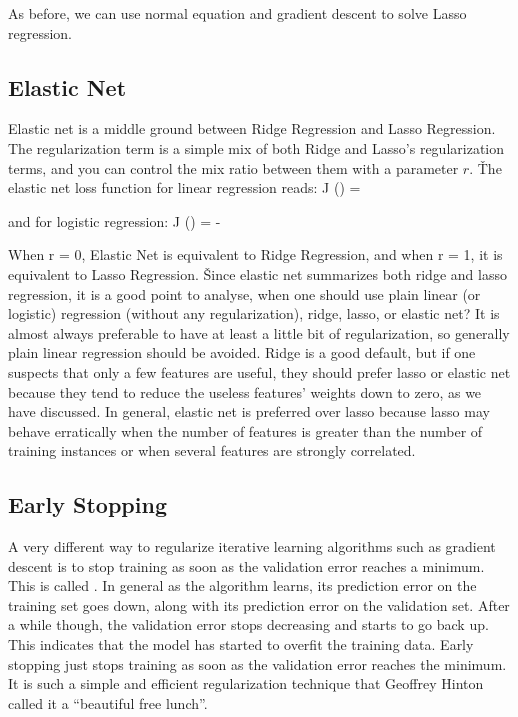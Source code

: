 As before, we can use normal equation and gradient descent to solve Lasso regression.

\subsection{Elastic Net}

Elastic net is a middle ground between Ridge Regression and Lasso Regression. The regularization term is a simple
mix of both Ridge and Lasso's regularization terms, and you can control the mix ratio between them with a parameter
$r$. \v

The elastic net loss function for linear regression reads:
\bse
J () =  
\ese

and for logistic regression:
\bse
J () = -  
\ese

When r = 0, Elastic Net is equivalent to Ridge Regression, and when r = 1, it is equivalent to Lasso Regression. \v

Since elastic net summarizes both ridge and lasso regression, it is a good point to analyse, when one should use
plain linear (or logistic) regression (without any regularization), ridge, lasso, or elastic net? It is almost always
preferable to have at least a little bit of regularization, so generally plain linear regression should be avoided.
Ridge is a good default, but if one suspects that only a few features are useful, they should prefer lasso or elastic
net because they tend to reduce the useless features' weights down to zero, as we have discussed. In general, elastic
net is preferred over lasso because lasso may behave erratically when the number of features is greater than the
number of training instances or when several features are strongly correlated.

\subsection{Early Stopping}

A very different way to regularize iterative learning algorithms such as gradient descent is to stop training as soon
as the validation error reaches a minimum. This is called . In general as the algorithm learns,
its prediction error on the training set goes down, along with its prediction error on the validation set. After a
while though, the validation error stops decreasing and starts to go back up. This indicates that the model has
started to overfit the training data. Early stopping just stops training as soon as the validation error reaches the
minimum. It is such a simple and efficient regularization technique that Geoffrey Hinton called it a ``beautiful free
lunch''.

